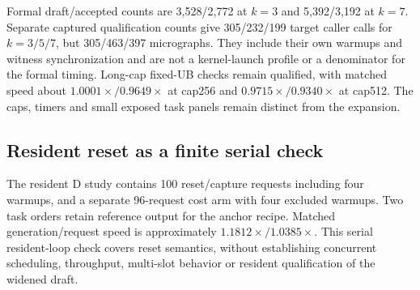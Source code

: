 

Formal draft/accepted counts are 3,528/2,772 at $k=3$ and 5,392/3,192 at $k=7$. Separate captured qualification counts give 305/232/199 target caller calls for $k=3/5/7$, but 305/463/397 micrographs. They include their own warmups and witness synchronization and are not a kernel-launch profile or a denominator for the formal timing. Long-cap fixed-UB checks remain qualified, with matched speed about $1.0001\times/0.9649\times$ at cap256 and $0.9715\times/0.9340\times$ at cap512. The caps, timers and small exposed task panels remain distinct from the expansion.

\subsection{Resident reset as a finite serial check}
\label{supp:resident_reset}
The resident D study contains 100 reset/capture requests including four warmups, and a separate 96-request cost arm with four excluded warmups. Two task orders retain reference output for the anchor recipe. Matched generation/request speed is approximately $1.1812\times/1.0385\times$. This serial resident-loop check covers reset semantics, without establishing concurrent scheduling, throughput, multi-slot behavior or resident qualification of the widened draft.
